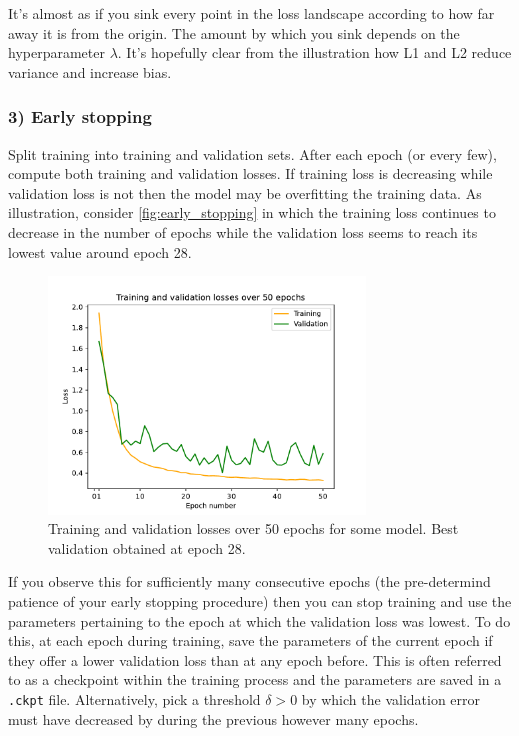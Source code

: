 \documentclass[11pt]{article}
\begin{document}

It's almost as if you sink every point in the loss landscape according to how far away it is from the origin. The amount by which you sink depends on the hyperparameter $\lambda$. It's hopefully clear from the illustration how L1 and L2 reduce variance and increase bias.

\subsubsection*{3) Early stopping} Split training into training and validation sets. After each epoch (or every few), compute both training and validation losses. If training loss is decreasing while validation loss is not then the model may be overfitting the training data. As illustration, consider \autoref{fig:early_stopping} in which the training loss continues to decrease in the number of epochs while the validation loss seems to reach its lowest value around epoch 28.

\begin{figure}[t]
    \centering
    \includegraphics[width=0.75\textwidth]{./figures/neural_nets/REG_early_stopping.pdf}
    \caption{Training and validation losses over 50 epochs for some model. Best validation obtained at epoch 28.}
    \label{fig:early_stopping}
\end{figure}

If you observe this for sufficiently many consecutive epochs (the pre-determind patience of your early stopping procedure) then you can stop training and use the parameters pertaining to the epoch at which the validation loss was lowest. To do this, at each epoch during training, save the parameters of the current epoch if they offer a lower validation loss than at any epoch before. This is often referred to as a checkpoint within the training process and the parameters are saved in a \texttt{.ckpt} file. Alternatively, pick a threshold $\delta>0$ by which the validation error must have decreased by during the previous however many epochs.
\end{document}
